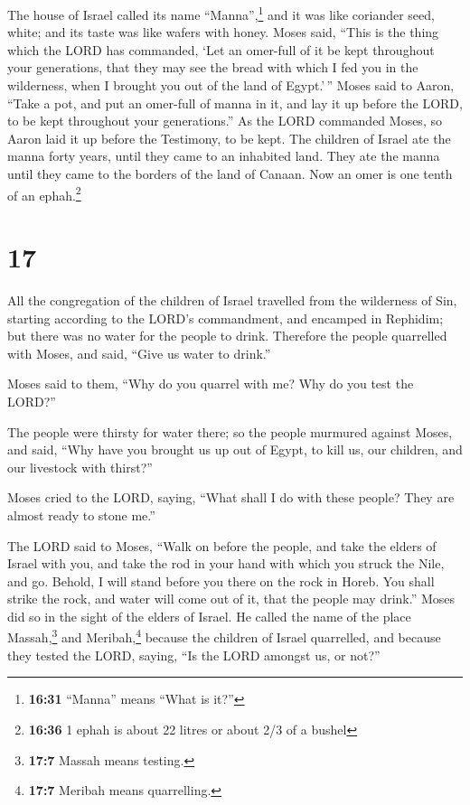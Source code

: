  The house of Israel called its name
``Manna'',\footnote{\textbf{16:31} ``Manna'' means ``What is it?''} and
it was like coriander seed, white; and its taste was like wafers with
honey.  Moses said, ``This is the thing which the LORD
has commanded, `Let an omer-full of it be kept throughout your
generations, that they may see the bread with which I fed you in the
wilderness, when I brought you out of the land of Egypt.'\,''
 Moses said to Aaron, ``Take a pot, and put an omer-full
of manna in it, and lay it up before the LORD, to be kept throughout
your generations.''  As the LORD commanded Moses, so
Aaron laid it up before the Testimony, to be kept.  The
children of Israel ate the manna forty years, until they came to an
inhabited land. They ate the manna until they came to the borders of the
land of Canaan.  Now an omer is one tenth of an
ephah.\footnote{\textbf{16:36} 1 ephah is about 22 litres or about 2/3
  of a bushel}

\hypertarget{section-16}{%
\section{17}\label{section-16}}

 All the congregation of the children of Israel travelled
from the wilderness of Sin, starting according to the LORD's
commandment, and encamped in Rephidim; but there was no water for the
people to drink.  Therefore the people quarrelled with
Moses, and said, ``Give us water to drink.''

Moses said to them, ``Why do you quarrel with me? Why do you test the
LORD?''

 The people were thirsty for water there; so the people
murmured against Moses, and said, ``Why have you brought us up out of
Egypt, to kill us, our children, and our livestock with thirst?''

 Moses cried to the LORD, saying, ``What shall I do with
these people? They are almost ready to stone me.''

 The LORD said to Moses, ``Walk on before the people, and
take the elders of Israel with you, and take the rod in your hand with
which you struck the Nile, and go.  Behold, I will stand
before you there on the rock in Horeb. You shall strike the rock, and
water will come out of it, that the people may drink.'' Moses did so in
the sight of the elders of Israel.  He called the name of
the place Massah,\footnote{\textbf{17:7} Massah means testing.} and
Meribah,\footnote{\textbf{17:7} Meribah means quarrelling.} because the
children of Israel quarrelled, and because they tested the LORD, saying,
``Is the LORD amongst us, or not?''

